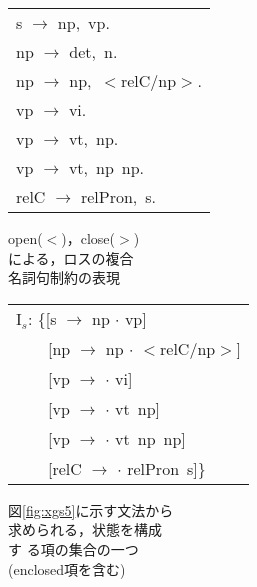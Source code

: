 \begin{figure}[htbp]
  \begin{center}
  \begin{minipage}[b]{5cm}
    \begin{center}
      \begin{tabular}[h]{l}
        s $\to$ np,\ vp.\\
        np $\to$ det,\ n.\\
        np $\to$ np,\ $<$relC/np$>$.\\
        vp $\to$ vi.\\
        vp $\to$ vt,\ np.\\
        vp $\to$ vt,\ np\ np.\\
        relC $\to$ relPron,\ s.
      \end{tabular}
      \caption{open($<$)，close($>$)\\による，ロスの複合\\名詞句制約の表現}
      \label{fig:xgs5}
    \end{center}
  \end{minipage}
  \hspace{1cm}
  \begin{minipage}[b]{5cm}
    \begin{center}
      {\small
        \begin{tabular}[h]{l}
          I$_{s}$: \{[s $\to$ np $\cdot$ vp] \\ 
          　　[np $\to$ np $\cdot$ $<$relC/np$>$] \\
          　　[vp $\to$ $\cdot$ vi] \\ 
          　　[vp $\to$ $\cdot$ vt\ np] \\
          　　[vp $\to$ $\cdot$ vt\ np\ np] \\
          　　[relC $\to$ $\cdot$ relPron\ s]\}
        \end{tabular}
        }
      \caption{図\ref{fig:xgs5}に示す文法から\\求められる，状態を構成\\す
        る項の集合の一つ\\(enclosed項を含む)}
      \label{fig:states8}
    \end{center}
  \end{minipage}
  \end{center}
\end{figure}

